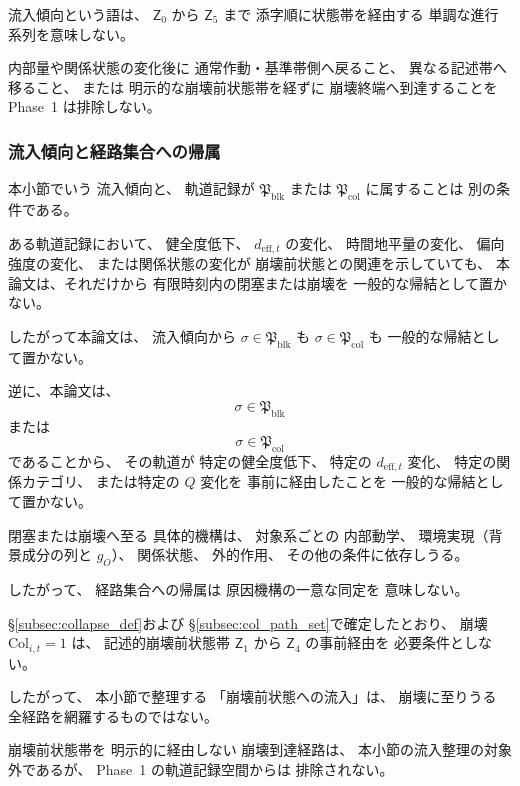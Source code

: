 \begin{remark}[流入傾向は基準帯からの単調離脱を意味しない]
\label{rem:inflow_not_monotone}
流入傾向という語は、
$\mathsf{Z}_0$ から $\mathsf{Z}_5$ まで
添字順に状態帯を経由する
単調な進行系列を意味しない。

内部量や関係状態の変化後に
通常作動・基準帯側へ戻ること、
異なる記述帯へ移ること、
または
明示的な崩壊前状態帯を経ずに
崩壊終端へ到達することを
Phase~1 は排除しない。
\end{remark}

\subsubsection{流入傾向と経路集合への帰属}

\begin{remark}[流入と経路集合への帰属の区別]
\label{rem:inflow_vs_membership}
本小節でいう
流入傾向と、
軌道記録が
$\mathfrak{P}_{\mathrm{blk}}$
または
$\mathfrak{P}_{\mathrm{col}}$
に属することは
別の条件である。

ある軌道記録において、
健全度低下、
$d_{\mathrm{eff},t}$ の変化、
時間地平量の変化、
偏向強度の変化、
または関係状態の変化が
崩壊前状態との関連を示していても、
本論文は、それだけから
有限時刻内の閉塞または崩壊を
一般的な帰結として置かない。

したがって本論文は、
流入傾向から
$\sigma\in\mathfrak{P}_{\mathrm{blk}}$ も
$\sigma\in\mathfrak{P}_{\mathrm{col}}$ も
一般的な帰結として置かない。
\end{remark}

\begin{remark}[経路集合への帰属から特定の流入機構を逆算しない]
\label{rem:membership_not_unique_inflow}
逆に、本論文は、
\[
  \sigma\in\mathfrak{P}_{\mathrm{blk}}
\]
または
\[
  \sigma\in\mathfrak{P}_{\mathrm{col}}
\]
であることから、
その軌道が
特定の健全度低下、
特定の $d_{\mathrm{eff},t}$ 変化、
特定の関係カテゴリ、
または特定の $Q$ 変化を
事前に経由したことを
一般的な帰結として置かない。

閉塞または崩壊へ至る
具体的機構は、
対象系ごとの
内部動学、
環境実現（背景成分の列と $g_O$）、
関係状態、
外的作用、
その他の条件に依存しうる。

したがって、
経路集合への帰属は
原因機構の一意な同定を
意味しない。
\end{remark}

\begin{remark}[崩壊前状態帯を経由しない崩壊との整合]
\label{rem:inflow_and_direct_collapse}
\S\ref{subsec:collapse_def}および
\S\ref{subsec:col_path_set}で確定したとおり、
崩壊
$\mathrm{Col}_{i,t}=1$
は、
記述的崩壊前状態帯
$\mathsf{Z}_1$ から
$\mathsf{Z}_4$
の事前経由を
必要条件としない。

したがって、
本小節で整理する
「崩壊前状態への流入」は、
崩壊に至りうる
全経路を網羅するものではない。

崩壊前状態帯を
明示的に経由しない
崩壊到達経路は、
本小節の流入整理の対象外であるが、
Phase~1 の軌道記録空間からは
排除されない。
\end{remark}

